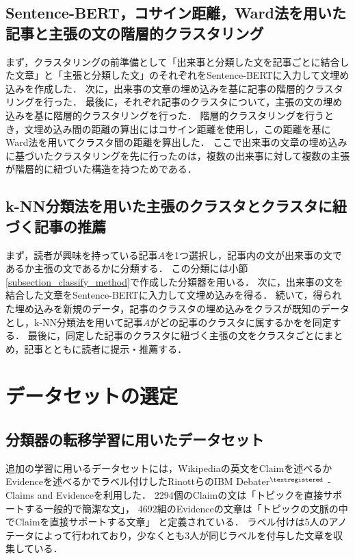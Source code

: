 \documentclass[12pt,a4j]{jreport}
\begin{document}
\subsection{Sentence-BERT，コサイン距離，Ward法を用いた記事と主張の文の階層的クラスタリング}

まず，クラスタリングの前準備として「出来事と分類した文を記事ごとに結合した文章」と「主張と分類した文」のそれぞれをSentence-BERTに入力して文埋め込みを作成した．
次に，出来事の文章の埋め込みを基に記事の階層的クラスタリングを行った．
最後に，それぞれ記事のクラスタについて，主張の文の埋め込みを基に階層的クラスタリングを行った．
階層的クラスタリングを行うとき，文埋め込み間の距離の算出にはコサイン距離を使用し，この距離を基にWard法を用いてクラスタ間の距離を算出した．
ここで出来事の文章の埋め込みに基づいたクラスタリングを先に行ったのは，複数の出来事に対して複数の主張が階層的に紐づいた構造を持つためである．

\subsection{k-NN分類法を用いた主張のクラスタとクラスタに紐づく記事の推薦}
まず，読者が興味を持っている記事$A$を1つ選択し，記事内の文が出来事の文であるか主張の文であるかに分類する．
この分類には小節\ref{subsection_classify_method}で作成した分類器を用いる．
次に，出来事の文を結合した文章をSentence-BERTに入力して文埋め込みを得る．
続いて，得られた埋め込みを新規のデータ，記事のクラスタの埋め込みをクラスが既知のデータとし，k-NN分類法を用いて記事$A$がどの記事のクラスタに属するかをを同定する．
最後に，同定した記事のクラスタに紐づく主張の文をクラスタごとにまとめ，記事とともに読者に提示・推薦する．


\section{データセットの選定}
\label{section_select_dataset}

\subsection{分類器の転移学習に用いたデータセット}
追加の学習に用いるデータセットには，Wikipediaの英文をClaimを述べるかEvidenceを述べるかでラベル付けしたRinottらのIBM Debater$^{\textregistered}$ - Claims and Evidenceを利用した\cite{rinott_show_2015}．
2294個のClaimの文は「トピックを直接サポートする一般的で簡潔な文」，
4692組のEvidenceの文章は「トピックの文脈の中でClaimを直接サポートする文章」
と定義されている．
ラベル付けは5人のアノテータによって行われており，少なくとも3人が同じラベルを付与した文章を収集している．
\end{document}

